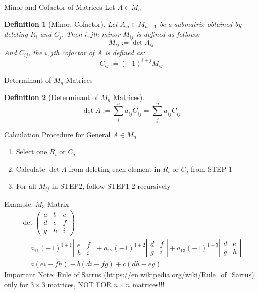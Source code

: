 \documentclass[a4paper,11pt]{article}
\newtheorem{defn}{Definition}
\begin{document}
\begin{frame}[t]{Minor and Cofactor of Matrices}
	Let $A\in M_n$
	\begin{defn}
		[Minor, Cofactor]
		Let $A_{ij}\in M_{n-1}$ be a submatrix obtained by deleting $R_i$ and $C_j$. Then $i,j$th minor $M_{ij}$ is defined as follows:
		\[
			M_{ij}:= \det A_{ij}
		\]
		And $C_{ij}$, the $i,j$th cofactor of $A$ is defined as:
		\[
			C_{ij}:= (-1)^{i+j}M_{ij}
		\]
	\end{defn}

\end{frame}
\begin{frame}[t]{Determinant of $M_n$ Matrices}
	\begin{defn}
		[Determinant of $M_n$ Matrices]
		\[
			\det A := \sum_i^n a_{i \bar j}C_{i \bar j} = \sum_j^n a_{\bar i j}C_{\bar i j}
		\]
	\end{defn}
	\begin{block}
		{Calculation Procedure for General $A\in M_n$}
		\begin{enumerate}[STEP 1:]
			\item Select one $R_i$ or $C_j$
			\item Calculate $\det A$ from deleting each element in $R_i$ or $C_j$ from STEP 1
			\item For all $M_{ij}$ in STEP2, follow STEP1-2 recursively
		\end{enumerate}
	\end{block}
\end{frame}

\begin{frame}[t]{Example: $M_3$ Matrix}
	\begin{multline*}
		\det \begin{pmatrix}
			a &b & c \\
			d&e&f\\
			g&h&i
		\end{pmatrix}
		\\= a_{11} (-1)^{1+1}\left\vert \begin{matrix}
			e&f\\
			h&i
		\end{matrix}\right\vert + a_{12} (-1)^{1+2}\left\vert \begin{matrix}
			d&f\\
			g&i
		\end{matrix}\right\vert + a_{13} (-1)^{1+3}\left\vert \begin{matrix}
			d&e\\
			g&h
		\end{matrix}\right\vert
		\\= a(ei-fh)-b(di-fg)+c(dh-eg)
	\end{multline*}
	Important Note: Rule of Sarrus (\url{https://en.wikipedia.org/wiki/Rule_of_Sarrus}) only for $3\times 3$ matrices, NOT FOR $n\times n$ matrices!!!
\end{frame}
\end{document}
